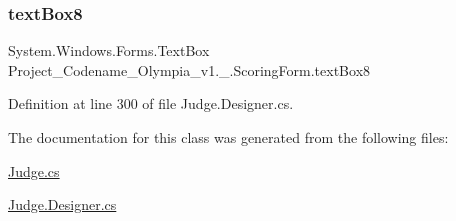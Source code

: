 \subsubsection{\texorpdfstring{text\+Box8}{textBox8}}
{\footnotesize\ttfamily System.\+Windows.\+Forms.\+Text\+Box Project\+\_\+\+Codename\+\_\+\+Olympia\+\_\+v1.\+\_.\+Scoring\+Form.\+text\+Box8\hspace{0.3cm}{\ttfamily [private]}}



Definition at line 300 of file Judge.\+Designer.\+cs.



The documentation for this class was generated from the following files\+:\begin{DoxyCompactItemize}
\item 
\hyperlink{Judge_8cs}{Judge.\+cs}\item 
\hyperlink{Judge_8Designer_8cs}{Judge.\+Designer.\+cs}\end{DoxyCompactItemize}
